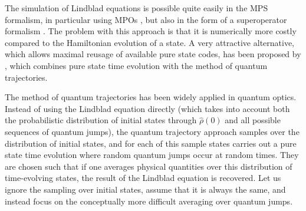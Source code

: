\documentclass[a4paper,10pt,oneside,onecolumn,1p,times]{elsarticle}
\begin{document}
The simulation of Lindblad equations is possible quite easily in the MPS formalism, in particular using MPOs \cite{VerstraeteRipoll04}, but also in the form of a superoperator formalism \cite{VidalZwolak04}. The problem with this approach is that it is numerically more costly compared to the Hamiltonian evolution of a state. A very attractive alternative, which allows maximal reusage of available pure state codes, has been proposed by \cite{Daley09}, which combines pure state time evolution with the method of quantum trajectories. 

The method of quantum trajectories has been widely applied in quantum optics\cite{Plenio98}. Instead of using the Lindblad equation directly (which takes into account both the probabilistic distribution of initial states through $\hat{\rho}(0)$ and all possible sequences of quantum jumps), the quantum trajectory approach samples over the distribution of initial states, and for each of this sample states carries out a pure state time evolution where random quantum jumps occur at random times. They are chosen such that if one averages physical quantities over this distribution of time-evolving states, the result of the Lindblad equation is recovered. Let us ignore the sampling over initial states, assume that it is always the same, and instead focus on the conceptually more difficult averaging over quantum jumps.
\end{document}
